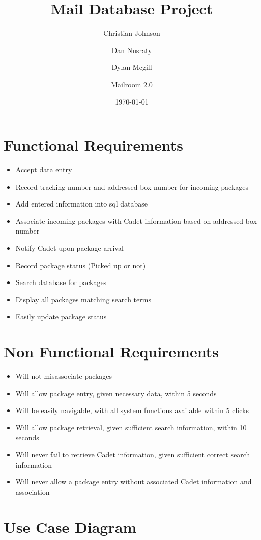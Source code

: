 \documentclass[11pt]{article}
\author{Christian Johnson\and Dan Nusraty\and Dylan Mcgill\and\newline Mailroom 2.0}
\date{\today}
\title{Mail Database Project}
\begin{document}
\maketitle
\clearpage
\section{Functional Requirements}
\label{sec:orgb9f452d}
\begin{itemize}
\item Accept data entry
\item Record tracking number and addressed box number for incoming packages
\item Add entered information into sql database
\item Associate incoming packages with Cadet information based on addressed box number
\item Notify Cadet upon package arrival
\item Record package status (Picked up or not)
\item Search database for packages
\item Display all packages matching search terms
\item Easily update package status
\end{itemize}
\section{Non Functional Requirements}
\label{sec:org7b0b54f}
\begin{itemize}
\item Will not misassociate packages
\item Will allow package entry, given necessary data, within 5 seconds
\item Will be easily navigable, with all system functions available within 5 clicks
\item Will allow package retrieval, given sufficient search information, within 10 seconds
\item Will never fail to retrieve Cadet information, given sufficient correct search information
\item Will never allow a package entry without associated Cadet information and association
\end{itemize}
\section{Use Case Diagram}
\label{sec:orge4cbbdf}
\end{document}
